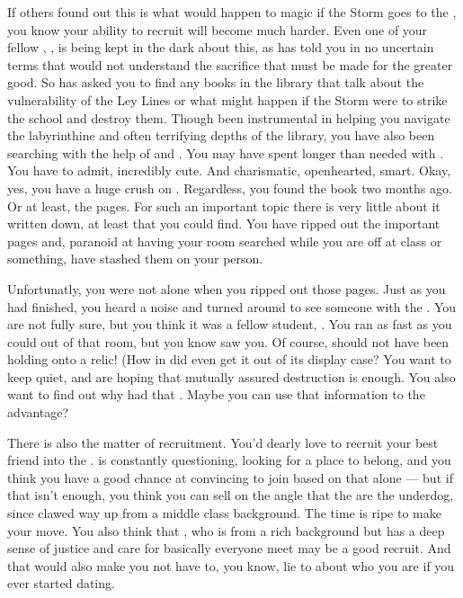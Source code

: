 \documentclass[char]{GL2020}
\begin{document}
If others found out this is what would happen to magic if the Storm goes to the \pSchool{}, you know your ability to recruit will become much harder. Even one of your fellow \pGoaties{}, \cChupInventor{\full}, is being kept in the dark about this, as \cChupSecond{} has told you in no uncertain terms that \cChupInventor{\they} would not understand the sacrifice that must be made for the greater good. So \cChupSecond{} has asked you to find any books in the library that talk about the vulnerability of the Ley Lines or what might happen if the Storm were to strike the school and destroy them. Though \cChupSecond{\theyhave} been instrumental in helping you navigate the labyrinthine and often terrifying depths of the library, you have also been searching with the help of \cAmbition{} and \cPresident{}. You may have spent longer than needed with \cPresident{}. You have to admit, \cPresident{\theyare} incredibly cute. And charismatic, openhearted, smart. Okay, yes, you have a huge crush on \cPresident{\them}. Regardless, you found the book two months ago. Or at least, the pages. For such an important topic there is very little about it written down, at least that you could find. You have ripped out the important pages and, paranoid at having your room searched while you are off at class or something, have stashed them on your person.  

Unfortunatly, you were not alone when you ripped out those pages. Just as you had finished, you heard a noise and turned around to see someone with the \iScythe{}.  You are not fully sure, but you think it was a fellow student, \cScholarship{\full}. You ran as fast as you could out of that room, but you know \cScholarship{\they} saw you.  Of course, \cScholarship{} should not have been holding onto a relic! (How in \pEarth{} did \cScholarship{\they} even get it out of its display case? You want to keep \cScholarship{\them} quiet, and are hoping that mutually assured destruction is enough. You also want to find out why \cScholarship{\they} had that \iScythe{}.  Maybe you can use that information to the \pGoaties{} advantage? 
 
There is also the matter of recruitment. You'd dearly love to recruit your best friend \cAmbition{} into the \pGoaties{}. \cAmbition{} is constantly questioning, looking for a place to belong, and you think you have a good chance at convincing \cAmbition{\them} to join based on that alone — but if that isn't enough, you think you can sell \cAmbition{\them} on the angle that the \pGoaties{} are the underdog, since \cAmbition{} clawed \cAmbition{\their} way up from a middle class background. The time is ripe to make your move. You also think that \cPresident{}, who is from a rich background but has a deep sense of justice and care for basically everyone \cPresident{\they} meet may be a good recruit.  And that would also make you not have to, you know, lie to \cPresident{} about who you are if you ever started dating.
\end{document}
